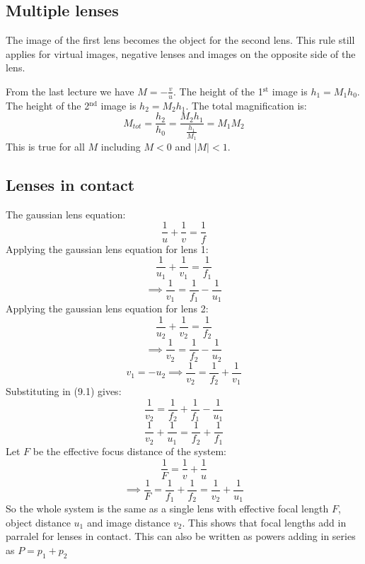 \documentclass{article}
\begin{document}
\section{}

\subsection*{Multiple lenses}

The image of the first lens becomes the object for the second lens. This rule still applies for virtual images, negative lenses and images on the opposite side of the lens.

From the last lecture we have \(M=-\frac vu\). The height  of the 1\(^{\text{st}}\) image is \(h_1=M_1h_0\). The height of the 2\(^{\text{nd}}\) image is \(h_2=M_2h_1\). The total magnification is:
\[M_{tot}=\frac{h_2}{h_0}=\frac{M_2h_1}{\frac{h_1}{M_1}}=M_1M_2\]
This is true for all \(M\) including \(M<0\) and \(|M|<1\).

\subsection*{Lenses in contact}
\begin{center}
\end{center}
The gaussian lens equation:
\[\frac 1u+\frac 1v=\frac 1f\]
Applying the gaussian lens equation for lens 1:
\[\frac{1}{u_1}+\frac{1}{v_1}=\frac{1}{f_1}\]
\[\implies \frac{1}{v_1}=\frac{1}{f_1}-\frac{1}{u_1}\tag{9.1}\]
Applying the gaussian lens equation for lens 2:
\[\frac{1}{u_2}+\frac{1}{v_2}=\frac{1}{f_2}\]
\[\implies \frac{1}{v_2}=\frac{1}{f_2}-\frac{1}{u_2}\]
\[v_1=-u_2\implies\frac{1}{v_2}=\frac{1}{f_2}+\frac{1}{v_1}\]
Substituting in (9.1) gives:
\[\frac{1}{v_2}=\frac{1}{f_2}+\frac{1}{f_1}-\frac{1}{u_1}\]
\[\frac{1}{v_2}+\frac{1}{u_1}=\frac{1}{f_2}+\frac{1}{f_1}\]
Let \(F\) be the effective focus distance of the system:
\[\frac 1F=\frac{1}{v}+\frac{1}{u}\]
\[\implies \frac{1}{F}=\frac{1}{f_1}+\frac{1}{f_2}=\frac{1}{v_2}+\frac{1}{u_1}\]
So the whole system is the same as a single lens with effective focal length \(F\), object distance \(u_1\) and image distance \(v_2\). This shows that focal lengths add in parralel for lenses in contact. This can also be written as powers adding in series as \(P=p_1+p_2\)
\end{document}
